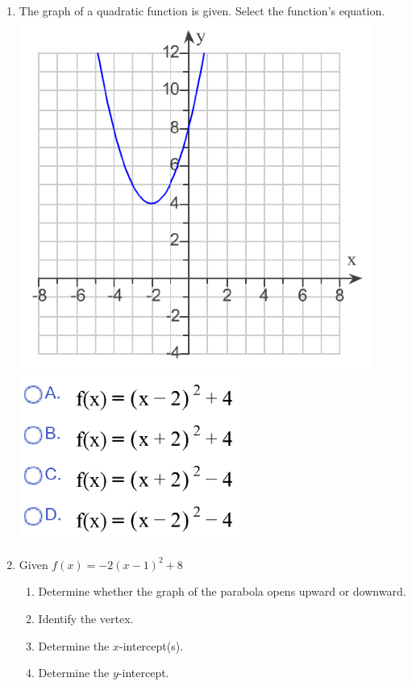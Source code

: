 \begin{enumerate}
\item The graph of a quadratic function is given.  Select the function's equation.\\
\includegraphics[scale=.7]{quad1a}\includegraphics[scale=.7]{quad1b}\\
\item Given $f(x)=-2(x-1)^2+8$
\begin{enumerate}
\item Determine whether the graph of the parabola opens upward or downward.\\[.3in]
\item Identify the vertex.\\[.3in]
\item Determine the $x$-intercept(s).\\[1in]
\item Determine the $y$-intercept.\\[.5in]


\end{enumerate}
\end{enumerate}
